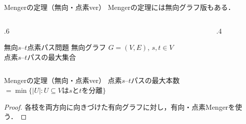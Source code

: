 \documentclass[14pt,aspectratio=169,xcolor=dvipsnames,table,onlytextwidth,dvipdfmx]{beamer}
\begin{document}
\begin{frame}{Mengerの定理（無向・点素ver）}
    Mengerの定理には無向グラフ版もある．
    
    \begin{columns}[T]
    \begin{column}{.6\textwidth}
    \begin{block}{無向$s$--$t$点素パス問題}
         無向グラフ $G = (V, E)$, $s, t \in V$  \\
         点素$s$--$t$パスの最大集合
    \end{block}
    \end{column}
    \begin{column}{.4\textwidth}
        \centering
    \end{column}
    \end{columns}

    \bigskip
    \begin{block}{Mengerの定理（無向・点素ver）}
        点素$s$--$t$パスの最大本数
        $= \min\{ |U| : U \subseteq V \text{は$s$と$t$を分離} \}$
    \end{block}
    \begin{proof}
     各枝を両方向に向きづけた有向グラフに対し，有向・点素Mengerを使う． 
    \end{proof}
\end{frame}
\end{document}
